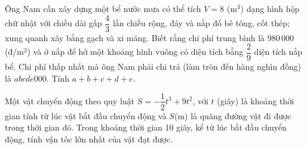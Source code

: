 \begin{bt}%
	Ông Nam cần xây dựng một bể nước mưa có thể tích $ V=8$ (m$^3$) dạng hình hộp chữ nhật với chiều dài  gấp $\dfrac{4}{3}$ lần chiều rộng, đáy và nắp đổ bê tông, cốt thép; xung quanh xây bằng gạch và xi măng. Biết rằng chi phí trung bình là $980\,000$ (đ/m$^2$) và ở nắp để hở một khoảng hình vuông có diện tích bằng $\dfrac{2}{9}$ diện tích nắp bể. Chi phí thấp nhất mà ông Nam phải chi trả (làm tròn đến hàng nghìn đồng) là $\overline{abcde000}$. Tính $a+b+c+d+e$.
\end{bt}

\begin{bt}%
	Một vật chuyển động theo quy luật $S=-\dfrac{1}{2} t^3+9 t^2$, với $t$ (giây) là khoảng thời gian tính từ lúc vật bắt đầu chuyển động và $S$(m) là quãng đường vật đi được trong thời gian đó. Trong khoảng thời gian 10 giây, kể từ lúc  bắt đầu chuyển động, tính vận tốc lớn nhất của vật đạt được.
\end{bt}

